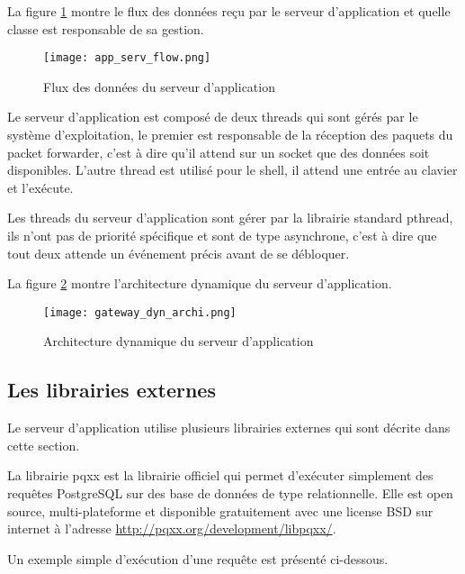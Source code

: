 
La figure \ref{fig:app_serv_flow} montre le flux des données reçu par le serveur d'application et quelle classe est responsable de sa gestion.

\begin{figure}[htb]
\centering 
\texttt{[image: app\_serv\_flow.png]} 
\caption{Flux des données du serveur d'application}
\label{fig:app_serv_flow}
\end{figure}

Le serveur d'application est composé de deux threads qui sont gérés par le système d'exploitation, le premier est responsable de la réception des paquets du packet forwarder, c'est à dire qu'il attend sur un socket que des données soit disponibles. L'autre thread est utilisé pour le shell, il attend une entrée au clavier et l'exécute.

Les threads du serveur d'application sont gérer par la librairie standard pthread, ils n'ont pas de priorité spécifique et sont de type asynchrone, c'est à dire que tout deux attende un événement précis avant de se débloquer.

La figure \ref{fig:gateway_dyn_archi} montre l'architecture dynamique du serveur d'application. 

\begin{figure}[htb]
\centering 
\texttt{[image: gateway\_dyn\_archi.png]} 
\caption{Architecture dynamique du serveur d'application}
\label{fig:gateway_dyn_archi}
\end{figure}

\subsection{Les librairies externes}

Le serveur d'application utilise plusieurs librairies externes qui sont décrite dans cette section.

La librairie pqxx est la librairie officiel qui permet d'exécuter simplement des requêtes PostgreSQL sur des base de données de type relationnelle. Elle est open source, multi-plateforme et disponible gratuitement avec une license BSD sur internet à l'adresse \url{http://pqxx.org/development/libpqxx/}.

Un exemple simple d'exécution d'une requête est présenté ci-dessous.

